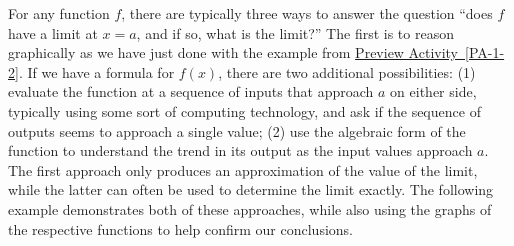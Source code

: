 \documentclass[10pt,]{book}
\theoremstyle{plain}
\theoremstyle{definition}
\theoremstyle{definition}
\theoremstyle{definition}
\theoremstyle{definition}
\theoremstyle{definition}
\numberwithin{equation}{section}
\begin{document}
For any function \(f\), there are typically three ways to answer the question ``does \(f\) have a limit at \(x = a\), and if so, what is the limit?'' The first is to reason graphically as we have just done with the example from \hyperref[PA-1-2]{Preview Activity~\ref{PA-1-2}}. If we have a formula for \(f(x)\), there are two additional possibilities: (1) evaluate the function at a sequence of inputs that approach \(a\) on either side, typically using some sort of computing technology, and ask if the sequence of outputs seems to approach a single value; (2) use the algebraic form of the function to understand the trend in its output as the input values approach \(a\). The first approach only produces an approximation of the value of the limit, while the latter can often be used to determine the limit exactly. The following example demonstrates both of these approaches, while also using the graphs of the respective functions to help confirm our conclusions.
%
\end{document}
